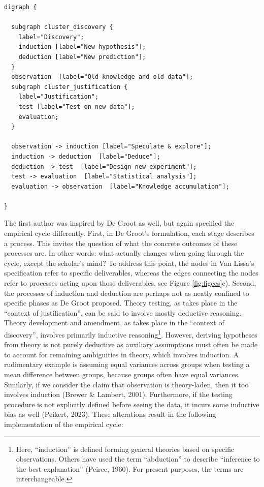 \documentclass[
  man, noextraspace,floatsintext]{apa6}
\begin{document}
\begin{verbatim}
digraph {

  subgraph cluster_discovery {
    label="Discovery";
    induction [label="New hypothesis"];
    deduction [label="New prediction"];
  }
  observation  [label="Old knowledge and old data"];
  subgraph cluster_justification {
    label="Justification";
    test [label="Test on new data"];
    evaluation;
  }

  observation -> induction [label="Speculate & explore"];
  induction -> deduction  [label="Deduce"];
  deduction -> test  [label="Design new experiment"];
  test -> evaluation  [label="Statistical analysis"];
  evaluation -> observation  [label="Knowledge accumulation"];

}
\end{verbatim}

The first author was inspired by De Groot as well,
but again specified the empirical cycle differently.
First, in De Groot's formulation, each stage describes a process.
This invites the question of what the concrete outcomes of these processes are.
In other words: what actually changes when going through the cycle, except the scholar's mind?
To address this point, the nodes in Van Lissa's specification refer to specific deliverables, whereas the edges connecting the nodes refer to processes acting upon those deliverables, see Figure \ref{fig:figecs}c).
Second, the processes of induction and deduction are perhaps not as neatly confined to specific phases as De Groot proposed.
Theory testing, as takes place in the ``context of justification'', can be said to involve mostly deductive reasoning.
Theory development and amendment, as takes place in the ``context of discovery'', involves primarily inductive reasoning\footnote{Here, ``induction'' is defined forming general theories based on specific observations. Others have used the term ``abduction'' to describe ``inference to the best explanation'' (Peirce, 1960). For present purposes, the terms are interchangeable.}.
However, deriving hypotheses from theory is not purely deductive
as auxiliary assumptions must often be made to account for remaining ambiguities in theory, which involves induction.
A rudimentary example is assuming equal variances across groups when testing a mean difference between groups, because groups often have equal variances.
Similarly, if we consider the claim that observation is theory-laden, then it too involves induction (Brewer \& Lambert, 2001).
Furthermore, if the testing procedure is not explicitly defined before seeing the data, it incurs some inductive bias as well (Peikert, 2023).
These alterations result in the following implementation of the empirical cycle:
\end{document}
